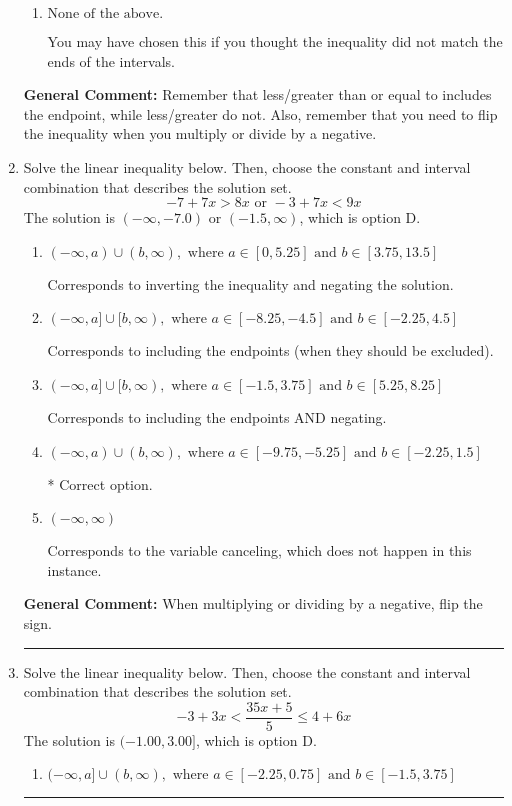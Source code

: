\documentclass{extbook}[14pt]
\newcommand{\litem}[1]{\item #1

\rule{\textwidth}{0.4pt}}
\begin{document}
\begin{enumerate}
{\begin{enumerate}[label=\Alph*.]
 $(-\infty, 1.65]$, which corresponds to switching the direction of the interval. You likely did this if you did not flip the inequality when dividing by a negative!
\item \( \text{None of the above}. \)

You may have chosen this if you thought the inequality did not match the ends of the intervals.
\end{enumerate}

\textbf{General Comment:} Remember that less/greater than or equal to includes the endpoint, while less/greater do not. Also, remember that you need to flip the inequality when you multiply or divide by a negative.
}
\litem{
Solve the linear inequality below. Then, choose the constant and interval combination that describes the solution set.
\[ -7 + 7 x > 8 x \text{ or } -3 + 7 x < 9 x \]The solution is \( (-\infty, -7.0) \text{ or } (-1.5, \infty) \), which is option D.\begin{enumerate}[label=\Alph*.]
\item \( (-\infty, a) \cup (b, \infty), \text{ where } a \in [0, 5.25] \text{ and } b \in [3.75, 13.5] \)

Corresponds to inverting the inequality and negating the solution.
\item \( (-\infty, a] \cup [b, \infty), \text{ where } a \in [-8.25, -4.5] \text{ and } b \in [-2.25, 4.5] \)

Corresponds to including the endpoints (when they should be excluded).
\item \( (-\infty, a] \cup [b, \infty), \text{ where } a \in [-1.5, 3.75] \text{ and } b \in [5.25, 8.25] \)

Corresponds to including the endpoints AND negating.
\item \( (-\infty, a) \cup (b, \infty), \text{ where } a \in [-9.75, -5.25] \text{ and } b \in [-2.25, 1.5] \)

 * Correct option.
\item \( (-\infty, \infty) \)

Corresponds to the variable canceling, which does not happen in this instance.
\end{enumerate}

\textbf{General Comment:} When multiplying or dividing by a negative, flip the sign.
}
\litem{
Solve the linear inequality below. Then, choose the constant and interval combination that describes the solution set.
\[ -3 + 3 x < \frac{35 x + 5}{5} \leq 4 + 6 x \]The solution is \( (-1.00, 3.00] \), which is option D.\begin{enumerate}[label=\Alph*.]
\item \( (-\infty, a] \cup (b, \infty), \text{ where } a \in [-2.25, 0.75] \text{ and } b \in [-1.5, 3.75] \)


\end{enumerate}}
\end{enumerate}
\end{document}
